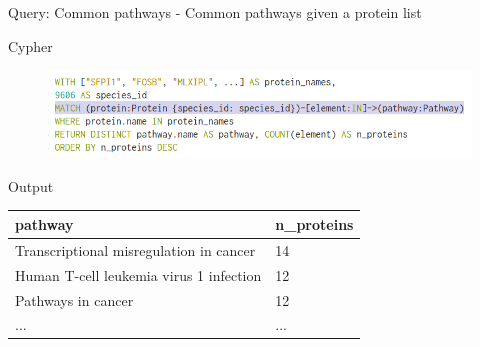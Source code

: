 \documentclass{beamer}
\begin{document}
\begin{frame}{Query: Common pathways}
- Common pathways given a protein list
\begin{block}{Cypher}
\begin{figure}
    \centering
    \includegraphics[width=\linewidth]{common_pathways_query.png}
\end{figure}
\end{block}
\vfill
\begin{block}{Output}
\small
\begin{tabular}{|l|l|}
    \hline
    pathway & n\_proteins\\ \hline \hline
    Transcriptional misregulation in cancer & 14\\ \hline
    Human T-cell leukemia virus 1 infection & 12\\ \hline
    Pathways in cancer & 12\\ \hline
    ... & ...\\
    \hline
\end{tabular}
\end{block}
\end{frame}
\end{document}
